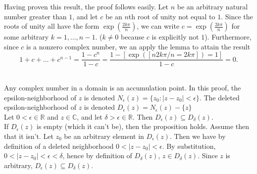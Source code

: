 \documentclass{article}
\theoremstyle{definition}
\newcommand{\R}{\mathbb{R}}
\newcommand{\C}{\mathbb{C}}
\newcommand{\cs}[1]{\color{blue}{#1}\normalcolor}
\begin{document}
\cs{It would be okay to take this as previously proven. (But nice job!} 

 Having proven this result, the proof follows easily. Let $n$ be an arbitrary natural number greater than $1$, and let $c$ be an $n$th root of unity not equal to $1$. Since the roots of unity all have the form $\exp(\frac{2k\pi}{n})$, \cs{Remember the $i$!} we can write $c = \exp(\frac{2k\pi}{n})$ for some arbitrary $k = 1,\dots,n-1$. ($k\ne 0$ because $c$ is explicitly not $1$). Furthermore, since $c$ is a nonzero complex number, we an apply the lemma to attain the result 
$$1+ c + \dots+ c^{n-1} = \frac{1-c^{n}}{1-c} = \frac{1-[\exp([n2k\pi/n = 2k\pi])= 1]}{1-c} = 0.$$\\

\cs{Without the $i$, this is false, so keep it in mind as you go.}
\cs{oh yeah, oops!}

\cs{5/5}

\cs{10/10}

 Any complex number in a domain is an accumulation point. In this proof, the epsilon-neighborhood of $z$ is denoted $N_\epsilon(z) = \{z_0:|z-z_0|<\epsilon\}$. The deleted epsilon-neighborhood of $z$ is denoted $D_\epsilon(z) = N_\epsilon(z) - \{z\}$\\

 Let $0<\epsilon\in \R$ and $z\in \C$, and let $\delta>\epsilon \in \R$. Then $D_\epsilon(z) \subseteq D_\delta(z)$.\\
 If $D_\epsilon(z)$ is empty (which it can't be), then the proposition holds. Assume then that it isn't. Let $z_0$ be an arbitrary element in $D_\epsilon(z)$. Then we have by definition of a deleted neighborhood $0<|z-z_0|< \epsilon$. By substitution, $0<|z-z_0| < \epsilon < \delta$, hence by definition of $D_\delta(z)$, $z\in D_\delta(z)$. \cs{Wait! By definition, $z$ is {\bf not} in $D_{\epsilon(z)}$!} Since $z$ is arbitrary, $D_\epsilon(z) \subseteq D_\delta(z).$\\ \cs{Did you mix up your $z$ and $z_0$?} \cs{oh, yeah that's definitely what happened}
\end{document}
